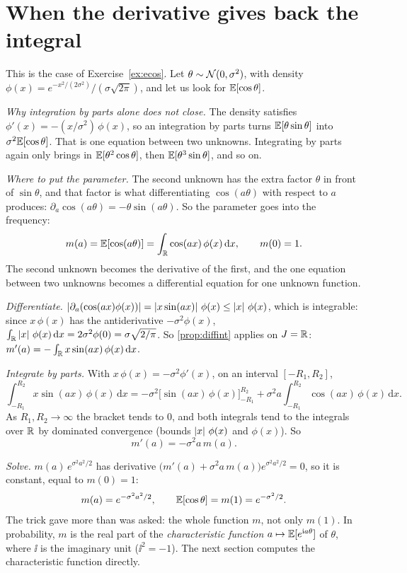 \section{When the derivative gives back the integral}
\label{sec:feyn-ode}

This is the case of Exercise~\ref{ex:ecos}. Let
$\theta\sim\mathcal{N}(0,\sigma^2)$, with density
$\phi(x)=e^{-x^2/(2\sigma^2)}/(\sigma\sqrt{2\pi})$, and let us look for
$\mathbb{E}[\cos\theta]$.

\emph{Why integration by parts alone does not close.} The density
satisfies $\phi'(x)=-(x/\sigma^2)\,\phi(x)$, so an integration by parts
turns $\mathbb{E}[\theta\sin\theta]$ into $\sigma^2\mathbb{E}[\cos\theta]$. That is one
equation between two unknowns. Integrating by parts again only brings in
$\mathbb{E}[\theta^2\cos\theta]$, then $\mathbb{E}[\theta^3\sin\theta]$, and so on.

\emph{Where to put the parameter.} The second unknown has the extra
factor $\theta$ in front of $\sin\theta$, and that factor is what
differentiating $\cos(a\theta)$ with respect to $a$ produces:
$\partial_a\cos(a\theta)=-\theta\sin(a\theta)$. So the parameter goes into
the frequency:
\[
  m(a)=\mathbb{E}[\cos(a\theta)]=\int_{\mathbb{R}}\cos(ax)\,\phi(x)\,\mathrm dx ,
  \qquad m(0)=1 .
\]
The second unknown becomes the derivative of the first, and the one
equation between two unknowns becomes a differential equation for one
unknown function.

\emph{Differentiate.} $\left\lvert \partial_a(\cos(ax)\phi(x))\right\rvert
=\left\lvert x\sin(ax)\right\rvert\,\phi(x)\le\left\lvert x\right\rvert\,\phi(x)$, which is integrable: since
$x\,\phi(x)$ has the antiderivative $-\sigma^2\phi(x)$,
$\int_{\mathbb{R}}\left\lvert x\right\rvert\,\phi(x)\,\mathrm dx=2\sigma^2\phi(0)=\sigma\sqrt{2/\pi}$. So
\cref{prop:diffint} applies on $J=\mathbb{R}$:
$m'(a)=-\int_{\mathbb{R}} x\sin(ax)\,\phi(x)\,\mathrm dx$.

\emph{Integrate by parts.} With $x\,\phi(x)=-\sigma^2\phi'(x)$, on an
interval $[-R_1,R_2]$,
\[
  \int_{-R_1}^{R_2}x\sin(ax)\,\phi(x)\,\mathrm dx
  =-\sigma^2\bigl[\sin(ax)\,\phi(x)\bigr]_{-R_1}^{R_2}
   +\sigma^2a\int_{-R_1}^{R_2}\cos(ax)\,\phi(x)\,\mathrm dx .
\]
As $R_1,R_2\to\infty$ the bracket tends to $0$, and both integrals tend
to the integrals over $\mathbb{R}$ by dominated convergence (bounds
$\left\lvert x\right\rvert\,\phi(x)$ and $\phi(x)$). So
\[
  m'(a)=-\sigma^2a\,m(a).
\]

\emph{Solve.} $m(a)\,e^{\sigma^2a^2/2}$ has derivative
$\bigl(m'(a)+\sigma^2a\,m(a)\bigr)e^{\sigma^2a^2/2}=0$, so it is constant,
equal to $m(0)=1$:
\[
  m(a)=e^{-\sigma^2a^2/2},\qquad \mathbb{E}[\cos\theta]=m(1)=e^{-\sigma^2/2}.
\]
The trick gave more than was asked: the whole function $m$, not only
$m(1)$. In probability, $m$ is the real part of the
\emph{characteristic function} $a\mapsto\mathbb{E}[e^{\mathrm{i} a\theta}]$ of
$\theta$, where $\ii$ is the imaginary unit ($\ii^2=-1$). The next
section computes the characteristic function directly.

